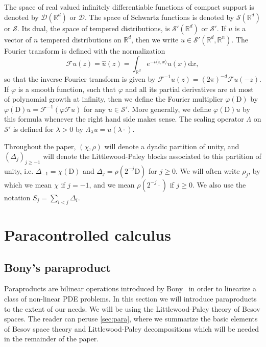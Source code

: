 \documentclass[a4paper,11pt]{article}
\newcommand{\mathD}{\mathrm{D}}
\newcommand{\mathd}{\mathrm{d}}
\theoremstyle{remark}
\newcommand{\CD}{\ensuremath{\mathscr{D}}}
\newcommand{\CF}{\ensuremath{\mathscr{F}}}
\newcommand{\CS}{\ensuremath{\mathscr{S}}}
\begin{document}
The space of real valued infinitely differentiable functions of compact support is denoted by $\CD ( \mathbb{R}^{d} )$ or $\CD$. The space of Schwartz functions is denoted by $\CS ( \mathbb{R}^{d} )$ or $\CS$. Its dual, the space of tempered distributions, is $\CS' ( \mathbb{R}^{d} )$ or $\CS'$. If $u$ is a vector of $n$ tempered distributions on $\mathbb{R}^{d}$, then we write $u \in \CS' (\mathbb{R}^{d} ,\mathbb{R}^{n} )$. The Fourier transform is defined with the normalization
\[
   \CF u ( z ) = \hat{u} ( z ) = \int_{\mathbb{R}^{d}} e^{- \iota \langle z,x \rangle} u ( x ) \mathd x,
\]
so that the inverse Fourier transform is given by $\CF^{-1} u ( z ) = ( 2 \pi)^{-d} \CF u ( -z )$. If $\varphi$ is a smooth function, such that $\varphi$ and all its partial derivatives are at most of polynomial growth at infinity, then we define the Fourier multiplier $\varphi ( \mathD )$ by $\varphi (\mathD ) u= \CF^{-1} ( \varphi \CF u)$ for any $u \in \CS'$. More generally, we define $\varphi ( \mathD ) u$ by this formula whenever the right hand side makes sense. The scaling operator $\Lambda$ on $\CS'$ is defined for $\lambda >0$ by $\Lambda_\lambda u = u(\lambda\cdot)$.

Throughout the paper, $(\chi, \rho)$ will denote a dyadic partition of unity, and $(\Delta_j)_{j \geqslant -1}$ will denote the Littlewood-Paley blocks associated to this partition of unity, i.e. $\Delta_{-1}= \chi(\mathD)$ and $\Delta_j = \rho(2^{-j} \mathD)$ for $j \geqslant 0$. We will often write $\rho_j$, by which we mean $\chi$ if $j=-1$, and we mean $\rho(2^{-j} \cdot)$ if $j \geqslant 0$. We also use the notation $S_j = \sum_{i < j} \Delta_i$.


\section{Paracontrolled calculus}\label{sec:paracontrolled}


\subsection{Bony's paraproduct}\label{sec:bony}

Paraproducts are bilinear operations introduced by Bony~\cite{Bony1981} in order to linearize a class of non-linear PDE problems. In this section we will introduce paraproducts to the extent of our needs. We will be using the Littlewood-Paley theory of Besov spaces. The reader can peruse \ref{sec:para}, where we summarize the basic elements of Besov space theory and Littlewood-Paley decompositions which will be needed in the remainder of the paper.
\end{document}
